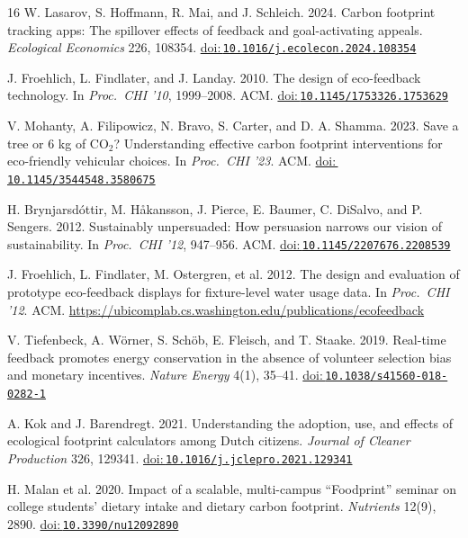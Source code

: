 \documentclass[10pt,a4paper,twocolumn]{article}
\newcommand{\doi}[1]{\href{https://doi.org/#1}{doi:\,\nolinkurl{#1}}}
\begin{document}
\begin{thebibliography}{16}
W. Lasarov, S. Hoffmann, R. Mai, and J. Schleich. 2024. Carbon footprint tracking apps: The spillover effects of feedback and goal-activating appeals. \emph{Ecological Economics} 226, 108354. \doi{10.1016/j.ecolecon.2024.108354}

J. Froehlich, L. Findlater, and J. Landay. 2010. The design of eco-feedback technology. In \emph{Proc.\ CHI '10}, 1999--2008. ACM. \doi{10.1145/1753326.1753629}

V. Mohanty, A. Filipowicz, N. Bravo, S. Carter, and D. A. Shamma. 2023. Save a tree or 6 kg of CO$_2$? Understanding effective carbon footprint interventions for eco-friendly vehicular choices. In \emph{Proc.\ CHI '23}. ACM. \doi{10.1145/3544548.3580675}

H. Brynjarsd\'ottir, M. H\r{a}kansson, J. Pierce, E. Baumer, C. DiSalvo, and P. Sengers. 2012. Sustainably unpersuaded: How persuasion narrows our vision of sustainability. In \emph{Proc.\ CHI '12}, 947--956. ACM. \doi{10.1145/2207676.2208539}

J. Froehlich, L. Findlater, M. Ostergren, et al. 2012. The design and evaluation of prototype eco-feedback displays for fixture-level water usage data. In \emph{Proc.\ CHI '12}. ACM. \url{https://ubicomplab.cs.washington.edu/publications/ecofeedback}

V. Tiefenbeck, A. W\"orner, S. Sch\"ob, E. Fleisch, and T. Staake. 2019. Real-time feedback promotes energy conservation in the absence of volunteer selection bias and monetary incentives. \emph{Nature Energy} 4(1), 35--41. \doi{10.1038/s41560-018-0282-1}

A. Kok and J. Barendregt. 2021. Understanding the adoption, use, and effects of ecological footprint calculators among Dutch citizens. \emph{Journal of Cleaner Production} 326, 129341. \doi{10.1016/j.jclepro.2021.129341}

H. Malan et al. 2020. Impact of a scalable, multi-campus ``Foodprint'' seminar on college students' dietary intake and dietary carbon footprint. \emph{Nutrients} 12(9), 2890. \doi{10.3390/nu12092890}

\end{thebibliography}
\end{document}
